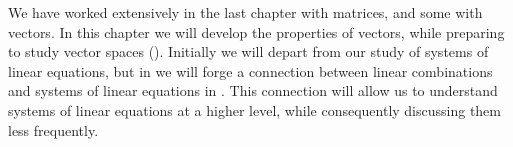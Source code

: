 We have worked extensively in the last chapter with matrices, and some with vectors.  In this chapter we will develop the properties of vectors, while preparing to study vector spaces ().  Initially we will depart from our study of systems of linear equations, but in  we will forge a connection between linear combinations and systems of linear equations in .  This connection will allow us to understand systems of linear equations at a higher level, while consequently discussing them less frequently.
